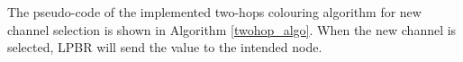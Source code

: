 The pseudo-code of the implemented two-hops colouring algorithm for new channel selection is shown in Algorithm \ref{twohop_algo}. When the new channel is selected, LPBR will send the value to the intended node.


